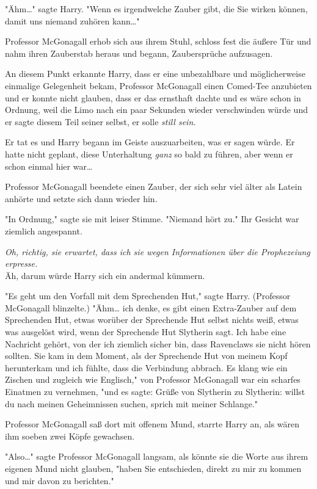 {"Ähm…" sagte Harry. "Wenn es irgendwelche Zauber gibt, die Sie wirken können, damit uns niemand zuhören kann…"

Professor McGonagall erhob sich aus ihrem Stuhl, schloss fest die äußere Tür und nahm ihren Zauberstab heraus und begann, Zaubersprüche aufzusagen.

An diesem Punkt erkannte Harry, dass er eine unbezahlbare und möglicherweise einmalige Gelegenheit bekam, Professor McGonagall einen Comed-Tee anzubieten und er konnte nicht glauben, dass er das ernsthaft dachte und es wäre schon in Ordnung, weil die Limo nach ein paar Sekunden wieder verschwinden würde und er sagte diesem Teil seiner selbst, er solle \emph{still sein.}

Er tat es und Harry begann im Geiste auszuarbeiten, was er sagen würde. Er hatte nicht geplant, diese Unterhaltung \emph{ganz} so bald zu führen, aber wenn er schon einmal hier war…

Professor McGonagall beendete einen Zauber, der sich sehr viel älter als Latein anhörte und setzte sich dann wieder hin.

"In Ordnung," sagte sie mit leiser Stimme. "Niemand hört zu." Ihr Gesicht war ziemlich angespannt.

\emph{Oh, richtig, sie erwartet, dass ich sie wegen Informationen über die Prophezeiung erpresse.}\\ Äh, darum würde Harry sich ein andermal kümmern.

"Es geht um den Vorfall mit dem Sprechenden Hut," sagte Harry. (Professor McGonagall blinzelte.) "Ähm… ich denke, es gibt einen Extra-Zauber auf dem Sprechenden Hut, etwas worüber der Sprechende Hut selbst nichts weiß, etwas was ausgelöst wird, wenn der Sprechende Hut Slytherin sagt. Ich habe eine Nachricht gehört, von der ich ziemlich sicher bin, dass Ravenclaws sie nicht hören sollten. Sie kam in dem Moment, als der Sprechende Hut von meinem Kopf herunterkam und ich fühlte, dass die Verbindung abbrach. Es klang wie ein Zischen und zugleich wie Englisch," von Professor McGonagall war ein scharfes Einatmen zu vernehmen, "und es sagte: Grüße von Slytherin zu Slytherin: willst du nach meinen Geheimnissen suchen, sprich mit meiner Schlange."

Professor McGonagall saß dort mit offenem Mund, starrte Harry an, als wären ihm soeben zwei Köpfe gewachsen.

"Also…" sagte Professor McGonagall langsam, als könnte sie die Worte aus ihrem eigenen Mund nicht glauben, "haben Sie entschieden, direkt zu mir zu kommen und mir davon zu berichten."

}
